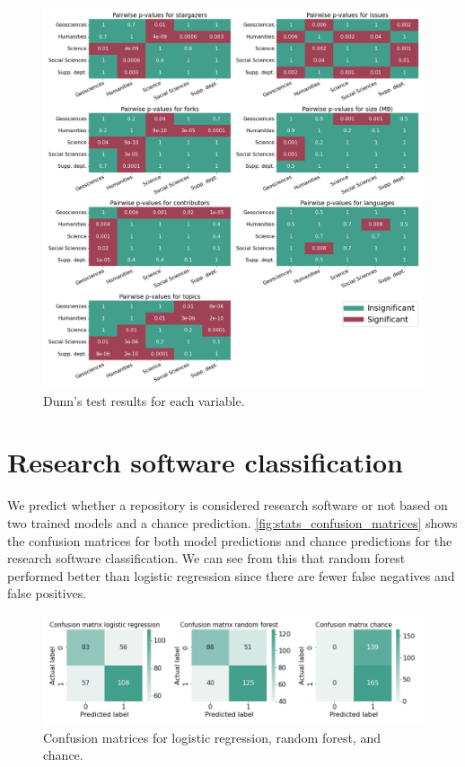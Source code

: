 \begin{figure}[h!]
\centerline{
\includegraphics[scale=0.47]{figures_results/stats_dunn_pvalues.png}}
\caption{Dunn's test results for each variable.
\label{fig:stats_dunn_pvalues}}
\end{figure}


\newpage
\section{Research software classification}
\label{sec:classification}
We predict whether a repository is considered research software or not based on two trained models and a chance prediction.
\autoref{fig:stats_confusion_matrices} shows the confusion matrices for both model predictions and chance predictions for the research software classification. We can see from this that random forest performed better than logistic regression since there are fewer false negatives and false positives. 

\begin{figure}[h!]
\centerline{
\includegraphics[scale=0.5]{figures_results/stats_confusion_matrices.png}}
\caption{Confusion matrices for logistic regression, random forest, and chance.
\label{fig:stats_confusion_matrices}}
\end{figure}




